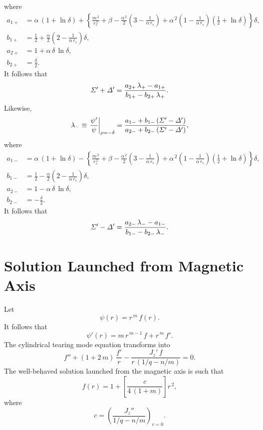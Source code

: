 \documentclass[notitlepage,12pt]{article}
\begin{document}
where
\begin{align}
a_{1+}&= \alpha\,(1+\ln\delta)+\left\{
\frac{m^{\,2}}{r_s^{\,2}} +\beta - \frac{\alpha^{\,2}}{2}\left(3-\frac{1}{\alpha\,r_s}\right)
+\alpha^{\,2}\left(1-\frac{1}{\alpha\,r_s}\right)\left(\frac{1}{2}+\ln\delta\right)\right\}\delta,\\[0.5ex]
b_{1+} &=\frac{1}{2}+ \frac{\alpha}{2}\left(2-\frac{1}{\alpha\,r_s}\right)\delta,\\[0.5ex]
a_{2+} &= 1+\alpha\,\delta\,\ln\delta,\\[0.5ex]
b_{2+} &= \frac{\delta}{2}.
\end{align}
It follows that
\begin{equation}
{\mit\Sigma}'+ {\mit\Delta}' = \frac{a_{2+}\,\lambda_+ - a_{1+}}{b_{1+}-b_{2+}\,\lambda_+}.
\end{equation}
Likewise,
\begin{equation}
\lambda_-\equiv \left.\frac{\psi'}{\psi}\right|_{\rho =-\delta} = \frac{a_{1-}+b_{1-}\,({\mit\Sigma}'-{\mit\Delta'})}{a_{2-}+ b_{2-}\,({\mit\Sigma}'-{\mit\Delta'})},
\end{equation}
where
\begin{align}
a_{1-}&= \alpha\,(1+\ln\delta)-\left\{
\frac{m^{\,2}}{r_s^{\,2}} +\beta - \frac{\alpha^{\,2}}{2}\left(3-\frac{1}{\alpha\,r_s}\right)
+\alpha^{\,2}\left(1-\frac{1}{\alpha\,r_s}\right)\left(\frac{1}{2}+\ln\delta\right)\right\}\delta,\\[0.5ex]
b_{1-} &=\frac{1}{2}- \frac{\alpha}{2}\left(2-\frac{1}{\alpha\,r_s}\right)\delta,\\[0.5ex]
a_{2-} &= 1-\alpha\,\delta\,\ln\delta,\\[0.5ex]
b_{2-} &= -\frac{\delta}{2}.
\end{align}
It follows that
\begin{equation}
{\mit\Sigma}'- {\mit\Delta}' = \frac{a_{2-}\,\lambda_- - a_{1-}}{b_{1-}-b_{2-}\,\lambda_-}.
\end{equation}

\section{Solution Launched from Magnetic Axis}
Let
\begin{equation}
\psi(r) = r^{\,m}\,f(r).
\end{equation}
It follows that
\begin{equation}
\psi'(r) = m\,r^{\,m-1}\,f + r^{\,m}\,f'.
\end{equation}
The cylindrical tearing mode equation transforms into
\begin{equation}
f'' + (1+2\,m)\,\frac{f'}{r} - \frac{J_z'\,f}{r\,(1/q-n/m)} = 0.
\end{equation}
The well-behaved solution launched from the magnetic axis is such that
\begin{equation}
f(r) = 1 +\left[\frac{c}{4\,(1+m)}\right]r^{\,2},
\end{equation}
where 
\begin{equation}
c = \left(\frac{J_z''}{1/q-n/m}\right)_{r=0}.
\end{equation}
\end{document}
